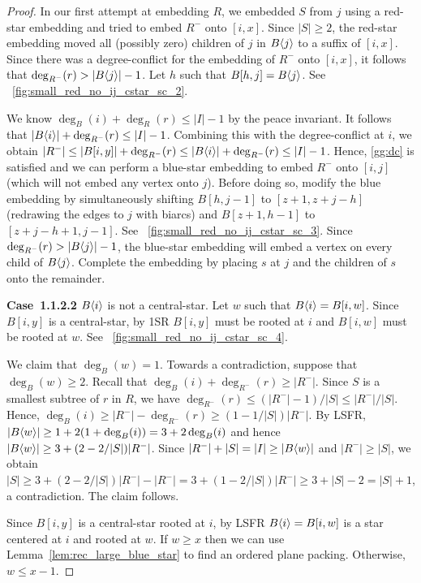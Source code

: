 \documentclass[11pt,a4paper,colorlinks=true,urlcolor=blue,citecolor=red]{article}
\theoremstyle{plain}
\newcommand{\case}[1]{\par\vspace{.5\baselineskip}\noindent\textbf{\sffamily Case~#1}}
\begin{document}
\begin{proof}
  In our first attempt at embedding $R$, we embedded $S$ from $j$ using
  a red-star embedding and tried to embed $R^-$ onto $[i,x]$.  Since
  $|S|\geq2$, the red-star embedding moved all (possibly zero) children
  of $j$ in $B\langle{j}\rangle$ to a suffix of $[i,x]$. Since there was a
  degree-conflict for the embedding of $R^-$ onto $[i,x]$, it follows
  that $\deg_{R^-}(r)>|B\langle{j}\rangle|-1$. Let $h$ such that
  $B[h,j]=B\langle{j}\rangle$. See
  \figurename~\ref{fig:small_red_no_ij_cstar_sc_2}.

  We know $\deg_B(i)+\deg_R(r)\leq |I|-1$ by the peace invariant. It
  follows that $|B\langle{i}\rangle|+\deg_{R^-}(r)\leq |I|-1$.  Combining this
  with the degree-conflict at $i$, we obtain
  $|R^-|\leq|B[i,y]|+\deg_{R^-}(r)\leq|B\langle{i}\rangle|+\deg_{R^-}(r)\leq|I|-1$.
  Hence, \ref{gg:dc} is satisfied and we can perform a blue-star
  embedding to embed $R^-$ onto $[i,j]$ (which will not embed any vertex
  onto $j$). Before doing so, modify the blue embedding by
  simultaneously shifting $B[h,j-1]$ to $[z+1,z+j-h]$ (redrawing the
  edges to $j$ with biarcs) and $B[z+1,h-1]$ to $[z+j-h+1,j-1]$. See
  \figurename~\ref{fig:small_red_no_ij_cstar_sc_3}. Since
  $\deg_{R^-}(r)>|B\langle{j}\rangle|-1$, the blue-star embedding will embed a
  vertex on every child of $B\langle{j}\rangle$. Complete the embedding by
  placing $s$ at $j$ and the children of $s$ onto the remainder.

  \case{1.1.2.2} $B\langle{i}\rangle$ is not a central-star. Let $w$ such that
  $B\langle{i}\rangle=B[i,w]$. Since $B[i,y]$ is a central-star, by 1SR $B[i,y]$
  must be rooted at $i$ and $B[i,w]$ must be rooted at $w$. See
  \figurename~\ref{fig:small_red_no_ij_cstar_sc_4}.

  We claim that $\deg_B(w)=1$. Towards a contradiction, suppose that
  $\deg_B(w)\geq 2$. Recall that $\deg_B(i)+\deg_{R^-}(r)\geq|R^-|$.
  Since $S$ is a smallest subtree of $r$ in $R$, we have
  $\deg_{R^-}(r)\leq (|R^-|-1)/|S|\leq|R^-|/|S|$. Hence, $\deg_B(i)\geq
  |R^-|-\deg_{R^-}(r)\geq(1-1/|S|)|R^-|$. By LSFR, $|B\langle{w}\rangle|\geq
  1+2(1+\deg_B(i))= 3+2\deg_B(i)$ and hence
  $|B\langle{w}\rangle|\geq3+(2-2/|S|)|R^-|$. Since
  $|R^-|+|S|=|I|\geq|B\langle{w}\rangle|$ and $|R^-|\geq|S|$, we obtain
  $|S|\geq3+(2-2/|S|)|R^-|-|R^-|=3+(1-2/|S|)|R^-|\geq3+|S|-2=|S|+1$, a
  contradiction. The claim follows.

  Since $B[i,y]$ is a central-star rooted at $i$, by LSFR
  $B\langle{i}\rangle=B[i,w]$ is a star centered at $i$ and rooted at $w$. If
  $w\geq x$ then we can use Lemma~\ref{lem:rec_large_blue_star} to find
  an ordered plane packing. Otherwise, $w\leq x-1$.


\end{proof}
\end{document}
